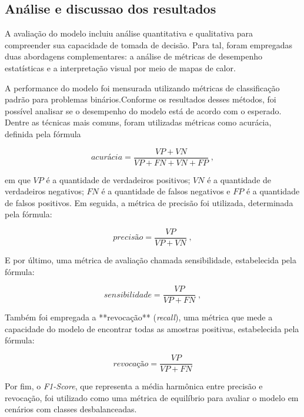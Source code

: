 \subsection{Análise e discussao dos resultados}

A avaliação do modelo incluiu análise quantitativa e qualitativa para compreender sua capacidade de tomada de decisão. Para tal, foram empregadas duas abordagens complementares: a análise de métricas de desempenho estatísticas e a interpretação visual por meio de mapas de calor.

A performance do modelo foi mensurada utilizando métricas de classificação padrão para problemas binários.Conforme os resultados desses métodos, foi possível analisar se o desempenho do modelo está de acordo com o esperado. Dentre as técnicas mais comuns, foram utilizadas métricas como acurácia, definida pela fórmula 

\begin{equation}
  acurácia = \frac{VP +VN}{VP + FN + VN + FP} \; ,
    \label{eq: acuracia}
\end{equation}

em que \(VP\) é a quantidade de verdadeiros positivos; \(VN\) é a quantidade de verdadeiros negativos; \(FN\) é a quantidade de falsos negativos e \(FP\) é a quantidade de falsos positivos. Em seguida, a métrica de precisão foi utilizada, determinada pela fórmula:

\begin{equation} 
  precisão = \frac{VP}{VP + VN} \; ,
  \label{eq: precisao}
\end{equation}

E por último, uma métrica de avaliação chamada sensibilidade, estabelecida pela fórmula:

\begin{equation}
sensibilidade = \frac{VP}{VP + FN} \; ,
  \label{eq: sensibilidade}
\end{equation}

Também foi empregada a **revocação** (\textit{recall}), uma métrica que mede a capacidade do modelo de encontrar todas as amostras positivas, estabelecida pela fórmula:

\begin{equation}
revocação = \frac{VP}{VP + FN}
  \label{eq:revocacao}
\end{equation}

Por fim, o \textit{F1-Score}, que representa a média harmônica entre precisão e revocação, foi utilizado como uma métrica de equilíbrio para avaliar o modelo em cenários com classes desbalanceadas.

